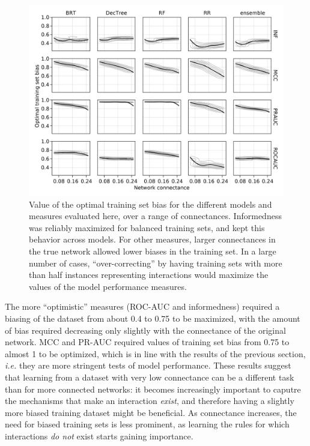 \documentclass[11pt]{article}
\makeatletter
\def\maxwidth{\ifdim\Gin@nat@width>\linewidth\linewidth
\else\Gin@nat@width\fi}
\let\Oldincludegraphics\includegraphics
\renewcommand{\includegraphics}[1]{\Oldincludegraphics[width=\maxwidth]{#1}}
\makeatother
\begin{document}
\begin{figure}
\hypertarget{fig:optimbias}{%
\centering
\includegraphics{figures/optim_bias.png}
\caption{Value of the optimal training set bias for the different models
and measures evaluated here, over a range of connectances. Informedness
was reliably maximized for balanced training sets, and kept this
behavior across models. For other measures, larger connectances in the
true network allowed lower biases in the training set. In a large number
of cases, ``over-correcting'' by having training sets with more than
half instances representing interactions would maximize the values of
the model performance measures.}\label{fig:optimbias}
}
\end{figure}

The more ``optimistic'' measures (ROC-AUC and informedness) required a
biasing of the dataset from about 0.4 to 0.75 to be maximized, with the
amount of bias required decreasing only slightly with the connectance of
the original network. MCC and PR-AUC required values of training set
bias from 0.75 to almost 1 to be optimized, which is in line with the
results of the previous section, \emph{i.e.} they are more stringent
tests of model performance. These results suggest that learning from a
dataset with very low connectance can be a different task than for more
connected networks: it becomes increasingly important to caputre the
mechanisms that make an interaction \emph{exist}, and therefore having a
slightly more biased training dataset might be beneficial. As
connectance increases, the need for biased training sets is less
prominent, as learning the rules for which interactions \emph{do not}
exist starts gaining importance.
\end{document}
